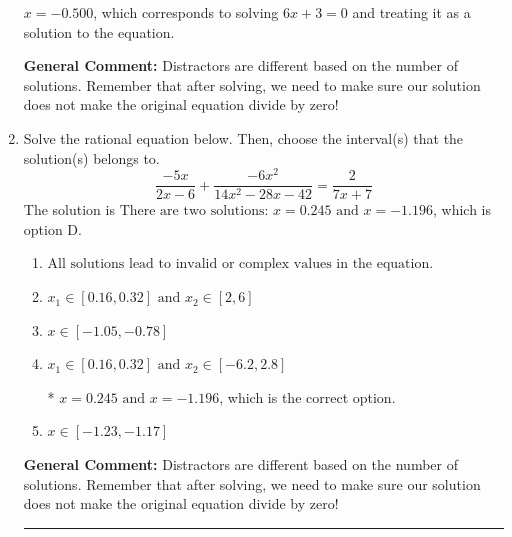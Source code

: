 \documentclass{extbook}[14pt]
\newcommand{\litem}[1]{\item #1

\rule{\textwidth}{0.4pt}}
\begin{document}
\begin{enumerate}
{\begin{enumerate}[label=\Alph*.]
$x = -0.500$, which corresponds to solving $6x + 3 = 0$ and treating it as a solution to the equation.
\end{enumerate}

\textbf{General Comment:} Distractors are different based on the number of solutions. Remember that after solving, we need to make sure our solution does not make the original equation divide by zero!
}
\litem{
Solve the rational equation below. Then, choose the interval(s) that the solution(s) belongs to.
\[ \frac{-5x}{2x -6} + \frac{-6x^{2}}{14x^{2} -28 x -42} = \frac{2}{7x + 7} \]The solution is \( \text{There are two solutions: } x = 0.245 \text{ and } x = -1.196 \), which is option D.\begin{enumerate}[label=\Alph*.]
\item \( \text{All solutions lead to invalid or complex values in the equation.} \)


\item \( x_1 \in [0.16, 0.32] \text{ and } x_2 \in [2,6] \)


\item \( x \in [-1.05,-0.78] \)


\item \( x_1 \in [0.16, 0.32] \text{ and } x_2 \in [-6.2,2.8] \)

* $x = 0.245 \text{ and } x = -1.196$, which is the correct option.
\item \( x \in [-1.23,-1.17] \)


\end{enumerate}

\textbf{General Comment:} Distractors are different based on the number of solutions. Remember that after solving, we need to make sure our solution does not make the original equation divide by zero!
}
\end{enumerate}
\end{document}
